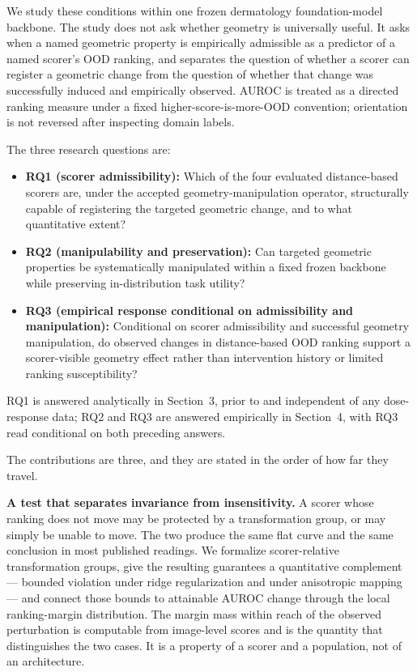 \documentclass[pdflatex,sn-basic]{sn-jnl}
\theoremstyle{plain}
\theoremstyle{definition}
\theoremstyle{remark}
\begin{document}
We study these conditions within one frozen dermatology foundation-model backbone. The study does not ask whether geometry is universally useful. It asks when a named geometric property is empirically admissible as a predictor of a named scorer's OOD ranking, and separates the question of whether a scorer can register a geometric change from the question of whether that change was successfully induced and empirically observed. AUROC is treated as a directed ranking measure \citep{fawcett2006introduction} under a fixed higher-score-is-more-OOD convention; orientation is not reversed after inspecting domain labels.

The three research questions are:
\begin{itemize}
\item \textbf{RQ1 (scorer admissibility):} Which of the four evaluated distance-based scorers are, under the accepted geometry-manipulation operator, structurally capable of registering the targeted geometric change, and to what quantitative extent?
\item \textbf{RQ2 (manipulability and preservation):} Can targeted geometric properties be systematically manipulated within a fixed frozen backbone while preserving in-distribution task utility?
\item \textbf{RQ3 (empirical response conditional on admissibility and manipulation):} Conditional on scorer admissibility and successful geometry manipulation, do observed changes in distance-based OOD ranking support a scorer-visible geometry effect rather than intervention history or limited ranking susceptibility?
\end{itemize}

RQ1 is answered analytically in Section~3, prior to and independent of any dose-response data; RQ2 and RQ3 are answered empirically in Section~4, with RQ3 read conditional on both preceding answers.

The contributions are three, and they are stated in the order of how far they
travel.

\textbf{A test that separates invariance from insensitivity.} A scorer whose
ranking does not move may be protected by a transformation group, or may simply
be unable to move. The two produce the same flat curve and the same conclusion
in most published readings. We formalize scorer-relative transformation groups,
give the resulting guarantees a quantitative complement --- bounded violation
under ridge regularization and under anisotropic mapping --- and connect those
bounds to attainable AUROC change through the local ranking-margin
distribution. The margin mass within reach of the observed perturbation is
computable from image-level scores and is the quantity that distinguishes the
two cases. It is a property of a scorer and a population, not of an
architecture.
\end{document}
